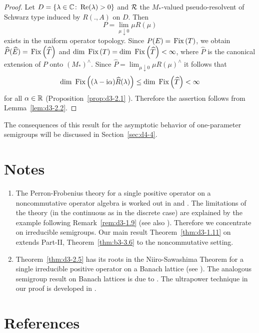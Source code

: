 \begin{proof}
Let $D = \{\lambda \in \mathbb{C} \colon \mathop{}\!\mathrm{Re}(\lambda) > 0\}$ and $\mathcal{R}$ the $M_{*}$-valued pseudo-resolvent of Schwarz type induced by $R(.,A)$ on $D$.
Then
\[
	P = \lim_{\mu \downarrow 0}\mu R(\mu)
\]
exists in the uniform operator topology.
Since $ P(E) = \mathop{}\mathrm{Fix}\left(T\right) $, we obtain $ \widehat{P}(\widehat{E}) = \mathop{}\mathrm{Fix}\left(\widehat{T}\right) $ and 
$\mathop{}\!\mathrm{dim}\, \mathop{}\mathrm{Fix}\left(T\right) = \mathop{}\!\mathrm{dim}\, \mathop{}\mathrm{Fix}\left(\widehat{T}\right) < \infty$, where $\widehat{P}$ is the canonical extension of\/ $P$ onto $(M_{*})^{\wedge}$.
Since $\widehat{P} = \lim_{\mu \downarrow 0} \mu R(\mu)^{\wedge}$ it follows that
\[
\dim \Fix  {(\lambda - \im\alpha)\widehat{R}(\lambda)} \leq \dim \Fix{\widehat{T}} < \infty
\]
for all $\alpha \in \mathbb{R}$ (Proposition~\ref{prop:d3-2.1} ).
Therefore the assertion follows from Lemma~\ref{lem:d3-2.2}.
\end{proof} 
The consequences of this result for the asymptotic behavior of one-parameter semigroups will be discussed in Section~\ref{sec:d4-4}.
\section*{Notes}\label{notes:d3-notes}
\begin{enumerate}[label=\emph{Section \arabic*:}, wide, itemsep=1ex]

\item
The Perron-Frobenius theory for a single positive operator on a noncommutative operator algebra is worked out in \textcite{albeverio:1978} and \textcite{groh:1981}.
The limitations of the theory (in the continuous as in the discrete case)
are explained by the example following Remark~\ref{rem:d3-1.9} (see also \textcite{groh:1982a}). 
Therefore we concentrate on irreducible semigroups.
Our main result Theorem~\ref{thm:d3-1.11} on extends Part-II, Theorem~\ref{thm:b3-3.6} to the noncommutative setting.

\item
Theorem~\ref{thm:d3-2.5} has its roots in the Niiro-Sawashima Theorem for a single irreducible positive operator on a Banach lattice (see \textcite[V.5.4]{schaefer:1974}).
The analogous semigroup result on Banach lattices is due to \textcite{greiner:1982}.
The ultrapower technique in our proof is developed in \textcite{groh:1984b}. 

\end{enumerate}
\section*{References}
{\RaggedRight
  \printbibliography[heading=none]
 }


































